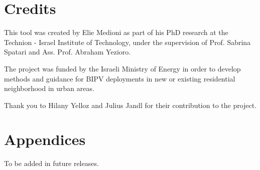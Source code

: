 \documentclass[a4paper,12pt]{article} %
\begin{document}
\section{Credits}
\label{sec:Credits}

This tool was created by Elie Medioni as part of his PhD
research at the Technion - Israel Institute of Technology, under the
supervision of Prof. Sabrina Spatari and Ass. Prof. Abraham Yezioro.

The project was funded by the Israeli Ministry of Energy in order to develop methods and guidance for BIPV deployments
in new or existing residential neighborhood in urban areas.

Thank you to Hilany Yelloz and Julius Jandl for their contribution to the project.


\section{Appendices}
\label{sec:Appendices}
To be added in future releases.
\end{document}
